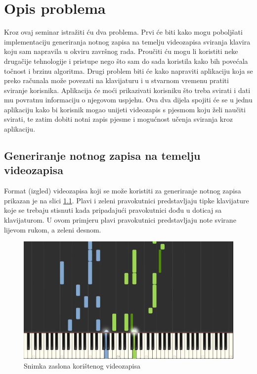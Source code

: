 \documentclass[times, utf8, seminar, numeric]{fer}
\begin{document}
\chapter{Opis problema}
Kroz ovaj seminar istražiti ću dva problema. Prvi će biti kako mogu poboljšati implementaciju generiranja notnog zapisa na temelju videozapisa sviranja klavira koju sam napravila u okviru završnog rada. Proučiti ću mogu li koristiti neke drugačije tehnologije i pristupe nego što sam do sada koristila kako bih povećala točnost i brzinu algoritma. Drugi problem biti će kako napraviti aplikaciju koja se preko računala može povezati na klavijaturu i u stvarnom vremenu pratiti sviranje korisnika. Aplikacija će moći prikazivati korisniku što treba svirati i dati mu povratnu informaciju o njegovom uspjehu. Ova dva dijela spojiti će se u jednu aplikaciju kako bi korisnik mogao unijeti videozapis s pjesmom koju želi naučiti svirati, te zatim dobiti notni zapis pjesme i mogućnost učenja sviranja kroz aplikaciju.

\section{Generiranje notnog zapisa na temelju videozapisa}
Format (izgled) videozapisa koji se može koristiti za generiranje notnog zapisa prikazan je na slici \ref{fig:nttdscreen}. Plavi i zeleni pravokutnici predstavljaju tipke klavijature koje se trebaju stisnuti kada pripadajući pravokutnici dođu u doticaj sa klavijaturom. U ovom primjeru plavi pravokutnici predstavljaju note svirane lijevom rukom, a zeleni desnom.

\begin{figure}[h]
	\includegraphics[scale=0.24]{nttdscreen.png}
	\centering
	\caption{Snimka zaslona korištenog videozapisa\cite{nttd}}
	\label{fig:nttdscreen}
\end{figure}
\end{document}
